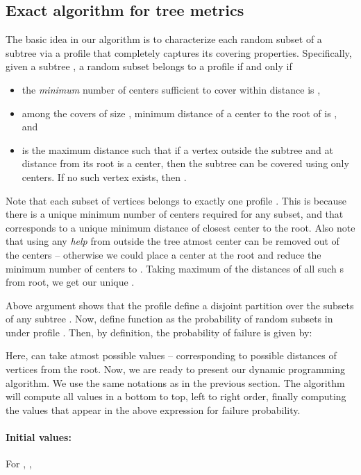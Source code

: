 \documentclass[11pt,onecolumn]{article}
\begin{document}
\subsection{Exact algorithm for tree metrics}
The basic idea in our algorithm is to characterize each random subset of a subtree via a profile  that completely captures its covering properties. Specifically, given a subtree , a random subset  belongs to a profile  if and only if
\begin{itemize}
\item the {\it minimum} number of centers sufficient to cover  within distance  is ,
\item among the covers of size , minimum distance of a center to the root of  is , and
\item  is the maximum distance such that if a vertex  outside the subtree  and at distance  from its root is a center, then the subtree can be covered using only  centers. 
If no such vertex  exists, then . 
\end{itemize}
Note that each subset of vertices belongs to exactly one profile . This is because there is a unique minimum
number of centers  required for any subset, and that corresponds to a unique minimum distance  of closest center
to the root. Also note that using any {\it help}  from 
outside the tree atmost  center can be removed out of the  centers -- otherwise we could place a center at the root and reduce the minimum  number of centers to . Taking maximum of the distances of all such s from root, we get our unique . 

Above argument shows that the profile  define a disjoint partition over the subsets of any subtree . 
Now, define function  as the probability of random subsets in  under profile . Then, by definition, the probability of failure is given by:

Here,  can take atmost  possible values -- corresponding to possible distances of vertices from the root.
Now, we are ready to present our dynamic programming algorithm. We use the same notations as in the previous section. The algorithm will compute all values  in a bottom to top, left to right order, finally computing the values  that appear in the above expression for failure probability.

\paragraph{Initial values: } For , ,
\end{document}

